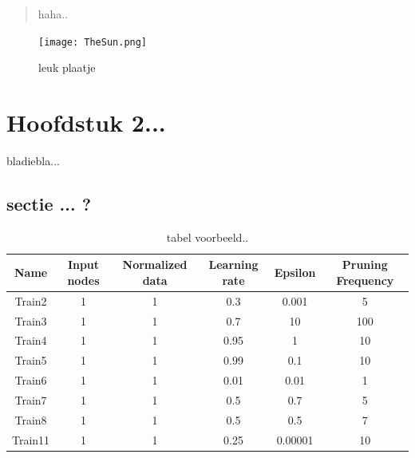\documentclass[11pt,fleqn]{book} %
\begin{document}
\begin{quote}
haha..
\end{quote}

\begin{figure}[h]
    \centering
    \texttt{[image: TheSun.png]}
    \caption{leuk plaatje}
    \label{fig:pca}
\end{figure}




\chapter{Hoofdstuk 2...}

bladiebla...

\section{sectie ... ?}


\begin{table}[h!]
  \centering
    \begin{tabular}{ c c c c c c }
    \hline\hline
    
    Name & Input nodes & Normalized data & Learning rate & Epsilon & Pruning Frequency\\
    \hline
    
    Train2 & 1 & 1 & 0.3 & 0.001 & 5\\
    Train3 & 1 & 1 & 0.7 & 10 & 100\\
    Train4 & 1 & 1 & 0.95 & 1 & 10\\
    Train5 & 1 & 1 & 0.99 & 0.1 & 10\\
    Train6 & 1 & 1 & 0.01 & 0.01 & 1\\
    Train7 & 1 & 1 & 0.5 & 0.7 & 5\\
    Train8 & 1 & 1 & 0.5 & 0.5 & 7\\
    Train11 & 1 & 1 & 0.25 & 0.00001 & 10\\
    
    \hline
  \end{tabular}
  \caption{tabel voorbeeld..}
  \label{tab:ds9failed}
\end{table}

\cite{book_key}

\end{document}
